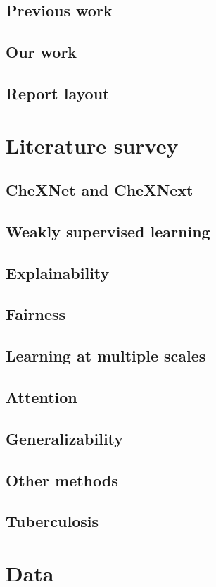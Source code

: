 \documentclass[11pt,twoside,a4paper]{report}
\begin{document}
    \section{Previous work}
    \section{Our work}
    \section{Report layout}
\chapter{Literature survey}
    \section{CheXNet and CheXNext}
    \section{Weakly supervised learning}
    \section{Explainability}
    \section{Fairness}
    \section{Learning at multiple scales}
    \section{Attention}
    \section{Generalizability}
    \section{Other methods}
    \section{Tuberculosis}
\chapter{Data}
\end{document}
